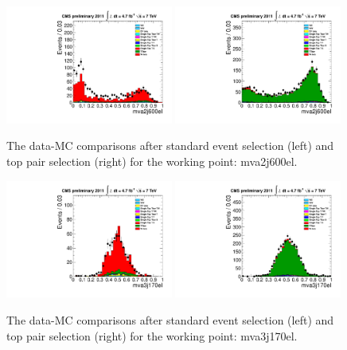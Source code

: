 \begin{figure}[!t]
  \centering
  \includegraphics[width=0.49\textwidth]{figs/cl-mva2j600el-normal.pdf}
  \includegraphics[width=0.49\textwidth]{figs/cl-mva2j600el-inTTbar.pdf}
  \caption{\label{fig:mva:plots-mva2j600el} The data-MC comparisons
    after standard event selection (left) and top pair
    selection (right) for the working point: mva2j600el.}
\end{figure}

\clearpage
\begin{figure}[!t]
  \centering
  \includegraphics[width=0.49\textwidth]{figs/cl-mva3j170el-normal.pdf}
  \includegraphics[width=0.49\textwidth]{figs/cl-mva3j170el-inTTbar.pdf}
  \caption{\label{fig:mva:plots-mva3j170el} The data-MC comparisons
    after standard event selection (left) and top pair
    selection (right) for the working point: mva3j170el.}
\end{figure}

